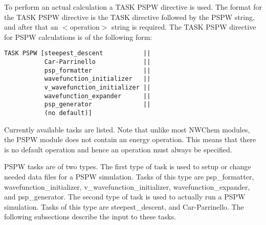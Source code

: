 To perform an actual calculation a TASK PSPW directive is used.
The format for the TASK PSPW directive is the TASK directive followed by the 
PSPW string, and after that an $<$operation$>$ string is required.  The 
TASK PSPW directive for PSPW calculations is of the following form:
\begin{verbatim}
TASK PSPW [steepest_descent           ||
           Car-Parrinello             ||
           psp_formatter              ||
           wavefunction_initializer   ||
           v_wavefunction_initializer ||
           wavefunction_expander      ||
           psp_generator              ||
           (no default)]
\end{verbatim}
Currently available tasks are listed.  Note that unlike most 
NWChem modules, the PSPW module does not contain an energy operation.  
This means that there is no default operation and hence an operation must 
always be specified.

PSPW tasks are of two types.  The first type of 
task is used to setup or change needed data files for a 
PSPW simulation.  Tasks of this type are psp\_formatter, 
wavefunction\_initializer, v\_wavefunction\_initializer, 
wavefunction\_expander, and psp\_generator.  The second type 
of task is used to actually run a PSPW simulation.  Tasks 
of this type are steepest\_descent, and Car-Parrinello.
The following subsections describe the input to these tasks.

